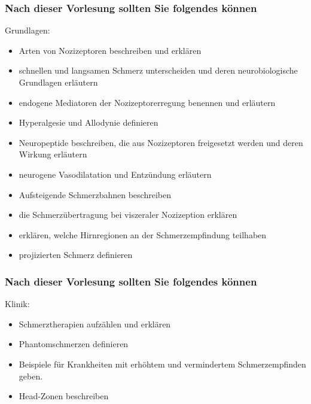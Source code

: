 \documentclass{beamer}
\begin{document}
\begin{frame}


 \frametitle{Nach dieser Vorlesung sollten Sie folgendes können}



\begin{block}{Grundlagen:}




\begin{itemize}

    \item 
Arten von Nozizeptoren beschreiben und erklären  %
    \item 
 schnellen und langsamen Schmerz unterscheiden und deren neurobiologische Grundlagen erläutern %
    \item 
 endogene Mediatoren der Nozizeptorerregung benennen und erläutern %
    \item 
Hyperalgesie und Allodynie definieren %
    \item 
 Neuropeptide beschreiben, die aus Nozizeptoren freigesetzt werden und deren Wirkung erläutern %
    \item 
 neurogene Vasodilatation und Entzündung erläutern
    \item 
 Aufsteigende Schmerzbahnen beschreiben %
    \item 
 die Schmerzübertragung bei viszeraler Nozizeption erklären  %
    \item 
erklären, welche  Hirnregionen an der Schmerzempfindung teilhaben %
    \item 
 projizierten Schmerz definieren %

\end{itemize}


\end{block}

\end{frame}


\begin{frame}


 \frametitle{Nach dieser Vorlesung sollten Sie folgendes können}
 

\begin{block}{Klinik:}

\begin{itemize}
    
\item 
Schmerztherapien aufzählen und erklären %
    \item 
 Phantomschmerzen definieren%
    \item 
 Beispiele für Krankheiten mit erhöhtem und vermindertem Schmerzempfinden geben. %
\item
Head-Zonen beschreiben %
\end{itemize}


\end{block}



\end{frame}
\end{document}
